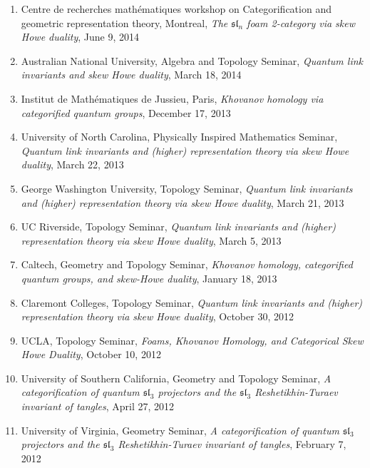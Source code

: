 \documentclass[10pt]{article}
\begin{document}
\begin{enumerate}
\item Centre de recherches math\'{e}matiques workshop on 
Categorification and geometric representation theory, Montreal,
\emph{The $\mathfrak{sl}_n$ foam 2-category via skew Howe duality}, June 9, 2014

\item Australian National University, Algebra and Topology Seminar, 
\emph{Quantum link invariants and skew Howe duality}, March 18, 2014

\item Institut de Math\'{e}matiques de Jussieu, Paris, 
\emph{Khovanov homology via categorified quantum groups},
December 17, 2013

\item University of North Carolina, Physically Inspired Mathematics Seminar, 
\emph{Quantum link invariants and (higher) representation theory 
via skew Howe duality}, March 22, 2013

\item George Washington University, Topology Seminar, 
\emph{Quantum link invariants and (higher) representation theory 
via skew Howe duality}, March 21, 2013

\item UC Riverside, Topology Seminar, 
\emph{Quantum link invariants and (higher) representation theory 
via skew Howe duality}, March 5, 2013

\item Caltech, Geometry and Topology Seminar, 
\emph{Khovanov homology, categorified quantum groups, 
and skew-Howe duality}, January 18, 2013

\item Claremont Colleges, Topology Seminar, 
\emph{Quantum link invariants and (higher) representation theory 
via skew Howe duality}, October 30, 2012

\item UCLA, Topology Seminar, 
\emph{Foams, Khovanov Homology, and Categorical Skew Howe Duality}, 
October 10, 2012

\item University of Southern California, Geometry and Topology Seminar, 
\emph{A categorification of quantum $\mathfrak{sl}_3$ projectors 
and the $\mathfrak{sl}_3$ Reshetikhin-Turaev invariant of tangles}, April 27, 2012

\item University of Virginia, Geometry Seminar, 
\emph{A categorification of quantum $\mathfrak{sl}_3$ projectors 
and the $\mathfrak{sl}_3$ Reshetikhin-Turaev invariant of tangles}, February 7, 2012


\end{enumerate}
\end{document}
